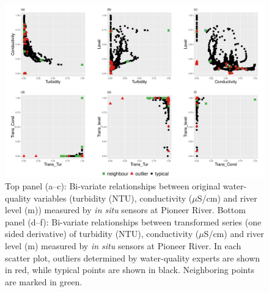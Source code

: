 \documentclass[draft]{agujournal2018} %
\begin{document}
\begin{figure}[H]

{\centering \includegraphics[width=1\textwidth]{./fig/VisualiseOutlierPairsOriginalDataPioneer-1.pdf}

}

\caption{Top panel (a--c): Bi-variate relationships between original water-quality variables (turbidity (NTU), conductivity ($\mu$S/cm) and river level (m)) measured by \textit{in situ} sensors at Pioneer River. Bottom panel (d--f): Bi-variate relationships between transformed series (one sided derivative) of turbidity (NTU), conductivity ($\mu$S/cm) and river level (m) measured by \textit{in situ} sensors at Pioneer River. In each scatter plot, outliers determined by water-quality experts are shown in red, while typical points are shown in black. Neighboring points are marked in green.}\label{fig:VisualiseOutlierPairstransDataPioneerPng}
\end{figure}
\end{document}
